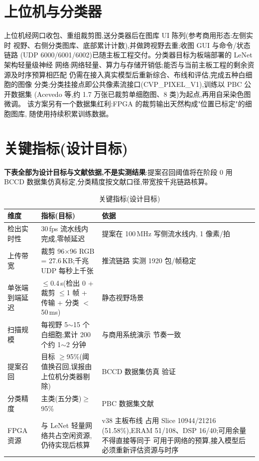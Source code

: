 \section{上位机与分类器}

上位机经网口收包、重组裁剪图,送分类器后在图库 UI 陈列(参考商用形态:左侧实时
视野、右侧分类图库、底部累计计数),并做跨视野去重;收图 GUI 与命令/状态链路
(UDP 6000/6001/6002)已随主板工程交付。分类器目标为板端部署的 LeNet 架构轻量级神经
网络:网络轻量、算力与存储开销低;能否与当前主板工程的剩余资源及时序预算相匹配
仍需在接入真实模型后重新综合、布线和评估,完成五种白细胞的图像
分类;分类挂接点即公共像素流接口(CVP\_PIXEL\_V1),训练以 PBC 公开数据集
(Acevedo 等,约 1.7 万张已裁剪单细胞图、8 类)为起点,再用自采染色图微调。
该方案另有一个数据集红利:FPGA 的裁剪输出天然构成"位置已标定"的细胞图库,
随使用持续积累训练数据。

\section{关键指标(设计目标)}

\textbf{下表全部为设计目标与文献依据,不是实测结果}:提案召回阈值将在阶段 0 用 BCCD
数据集仿真标定,分类精度按文献口径,带宽按千兆链路核算。

\begin{table}[H]\centering\small
\caption{关键指标(设计目标)}
\begin{tabular}{p{3.2cm}p{6.4cm}p{4.6cm}}
\toprule
维度 & 指标(目标) & 依据 \\
\midrule
检出实时性 & 30\,fps 流水线内完成,零帧延迟 & 提案在 100\,MHz 写侧流水线内,
1 像素/拍 \\
上传带宽 & 裁剪 96$\times$96 RGB = 27.6\,KB;千兆 UDP 每秒上千张 & 推流链路
实测 1920 包/帧稳定 \\
单张端到端延迟 & $\leq$0.4\,s(检出 0 + 裁剪 $\leq$1 帧 + 传输 + 分类 $<$50\,ms) &
静态视野场景 \\
扫描规模 & 每视野 5$\sim$15 个白细胞;累计 200 个约 1$\sim$2 分钟 & 与商用系统演示
节奏一致 \\
提案召回 & 目标 $\geq$95\%(阈值换召回,误报由上位机分类器剔除) & BCCD 数据集仿真
验证 \\
分类精度 & 主类(五分类)$\geq$95\% & PBC 数据集文献 \\
FPGA 资源 & 与 LeNet 轻量网络共占空闲资源,仍待实现后核算 & v38 主板布线
占用 Slice 10944/21216 (51.58\%),ERAM 51/108、DSP 16/40;可用余量不得直接等同于
可用于网络的预算,接入模型后必须重新评估资源与时序 \\
\bottomrule
\end{tabular}
\end{table}

